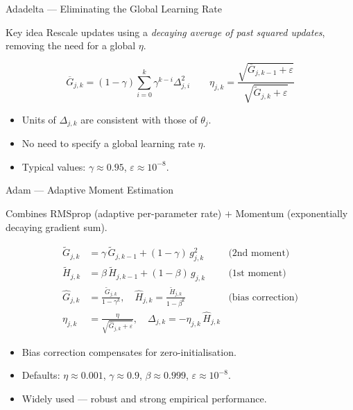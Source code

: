\begin{frame}{Adadelta — Eliminating the Global Learning Rate}
  \begin{block}{Key idea}
    Rescale updates using a \emph{decaying average of past squared updates},
    removing the need for a global $\eta$.
  \end{block}
  \vspace{4pt}
  \[
    \overline G_{j,k} = (1-\gamma)\sum_{i=0}^k\gamma^{k-i}\Delta_{j,i}^2
    \qquad
    \eta_{j,k} = \frac{\sqrt{\overline G_{j,k-1}+\varepsilon}}{\sqrt{\tilde G_{j,k}+\varepsilon}}
  \]
  \begin{itemize}
    \item Units of $\Delta_{j,k}$ are consistent with those of $\theta_j$.
    \item No need to specify a global learning rate $\eta$.
    \item Typical values: $\gamma\approx 0.95$, $\varepsilon\approx 10^{-8}$.
  \end{itemize}
\end{frame}

\begin{frame}{Adam — Adaptive Moment Estimation}
  \begin{block}{Combines}
    RMSprop (adaptive per-parameter rate) $+$ Momentum (exponentially decaying gradient sum).
  \end{block}
  \vspace{4pt}
  \begin{align*}
    \tilde G_{j,k} &= \gamma\,\tilde G_{j,k-1} + (1-\gamma)\,g_{j,k}^2
      &\text{(2nd moment)}\\
    \tilde H_{j,k} &= \beta\,\tilde H_{j,k-1} + (1-\beta)\,g_{j,k}
      &\text{(1st moment)}\\[4pt]
    \hat G_{j,k} &= \frac{\tilde G_{j,k}}{1-\gamma^k},\quad
    \hat H_{j,k} = \frac{\tilde H_{j,k}}{1-\beta^k}
      &\text{(bias correction)}\\[4pt]
    \eta_{j,k} &= \frac{\eta}{\sqrt{\hat G_{j,k}+\varepsilon}},\quad
    \Delta_{j,k} = -\eta_{j,k}\,\hat H_{j,k}
  \end{align*}
  \begin{itemize}
    \item Bias correction compensates for zero-initialisation.
    \item Defaults: $\eta\approx 0.001$, $\gamma\approx 0.9$, $\beta\approx 0.999$, $\varepsilon\approx 10^{-8}$.
    \item Widely used — robust and strong empirical performance.
  \end{itemize}
\end{frame}


